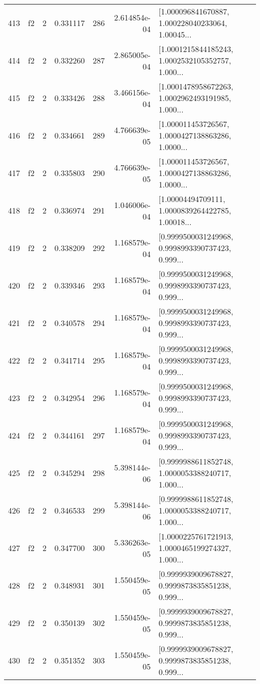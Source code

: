 \begin{tabular}{lllrlrl}
413 &  f2 &   2 &  0.331117 &  286 &  2.614854e-04 &  [1.000096841670887, 1.000228040233064, 1.00045... \\
414 &  f2 &   2 &  0.332260 &  287 &  2.865005e-04 &  [1.0001215844185243, 1.0002532105352757, 1.000... \\
415 &  f2 &   2 &  0.333426 &  288 &  3.466156e-04 &  [1.0001478958672263, 1.0002962493191985, 1.000... \\
416 &  f2 &   2 &  0.334661 &  289 &  4.766639e-05 &  [1.000011453726567, 1.0000427138863286, 1.0000... \\
417 &  f2 &   2 &  0.335803 &  290 &  4.766639e-05 &  [1.000011453726567, 1.0000427138863286, 1.0000... \\
418 &  f2 &   2 &  0.336974 &  291 &  1.046006e-04 &  [1.00004494709111, 1.0000839264422785, 1.00018... \\
419 &  f2 &   2 &  0.338209 &  292 &  1.168579e-04 &  [0.9999500031249968, 0.9998993390737423, 0.999... \\
420 &  f2 &   2 &  0.339346 &  293 &  1.168579e-04 &  [0.9999500031249968, 0.9998993390737423, 0.999... \\
421 &  f2 &   2 &  0.340578 &  294 &  1.168579e-04 &  [0.9999500031249968, 0.9998993390737423, 0.999... \\
422 &  f2 &   2 &  0.341714 &  295 &  1.168579e-04 &  [0.9999500031249968, 0.9998993390737423, 0.999... \\
423 &  f2 &   2 &  0.342954 &  296 &  1.168579e-04 &  [0.9999500031249968, 0.9998993390737423, 0.999... \\
424 &  f2 &   2 &  0.344161 &  297 &  1.168579e-04 &  [0.9999500031249968, 0.9998993390737423, 0.999... \\
425 &  f2 &   2 &  0.345294 &  298 &  5.398144e-06 &  [0.9999988611852748, 1.0000053388240717, 1.000... \\
426 &  f2 &   2 &  0.346533 &  299 &  5.398144e-06 &  [0.9999988611852748, 1.0000053388240717, 1.000... \\
427 &  f2 &   2 &  0.347700 &  300 &  5.336263e-05 &  [1.0000225761721913, 1.0000465199274327, 1.000... \\
428 &  f2 &   2 &  0.348931 &  301 &  1.550459e-05 &  [0.9999939009678827, 0.9999873835851238, 0.999... \\
429 &  f2 &   2 &  0.350139 &  302 &  1.550459e-05 &  [0.9999939009678827, 0.9999873835851238, 0.999... \\
430 &  f2 &   2 &  0.351352 &  303 &  1.550459e-05 &  [0.9999939009678827, 0.9999873835851238, 0.999... \\

\end{tabular}
